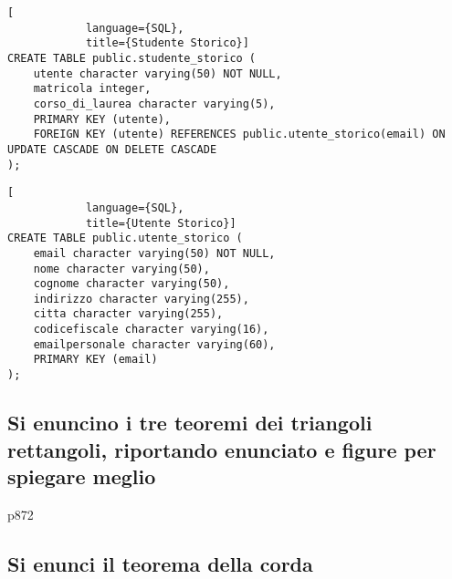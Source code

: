 \documentclass{article}
\begin{document}
\begin{enumerate}
        \begin{lstlisting}[
            language={SQL},
            title={Studente Storico}]
CREATE TABLE public.studente_storico (
    utente character varying(50) NOT NULL,
    matricola integer,
    corso_di_laurea character varying(5),
    PRIMARY KEY (utente),
    FOREIGN KEY (utente) REFERENCES public.utente_storico(email) ON UPDATE CASCADE ON DELETE CASCADE
);
        \end{lstlisting}

        \begin{lstlisting}[
            language={SQL},
            title={Utente Storico}]
CREATE TABLE public.utente_storico (
    email character varying(50) NOT NULL,
    nome character varying(50),
    cognome character varying(50),
    indirizzo character varying(255),
    citta character varying(255),
    codicefiscale character varying(16),
    emailpersonale character varying(60),
    PRIMARY KEY (email)
);
        \end{lstlisting}


    \end{enumerate}














    \subsection{Si enuncino i tre teoremi dei triangoli rettangoli, riportando enunciato e figure per spiegare meglio} \hspace{50} p872
    \subsection{Si enunci il teorema della corda}
\end{document}
